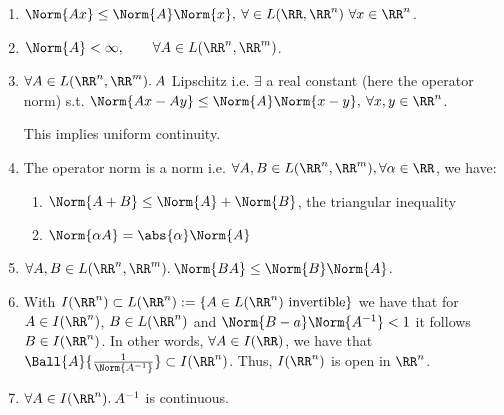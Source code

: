 \begin{thm}
 \begin{enumerate}
  \item $\Norm{Ax}\leq\Norm{A}\Norm{x}, \:\forall\in L(\RR, \RR^n)\ \forall x\in\RR^n$.
  \item $\Norm{A}<\infty,\qquad\forall A\in L(\RR^n,\RR^m)$.
  \item $\forall A\in L(\RR^n, \RR^m).\:A$ Lipschitz i.e. $\exists$ a real constant (here the operator norm) s.t. $\Norm{Ax-Ay}\leq\Norm{A}\Norm{x-y}, \:\forall x,y\in\RR^n$.
  \begin{exc}
   This implies uniform continuity.
  \end{exc}
  \item The operator norm is a norm i.e. $\forall A, B\in L(\RR^n,\RR^m), \forall \alpha\in\RR$, we have:
  \begin{enumerate}
   \item $\Norm{A+B}\leq \Norm{A}+\Norm{B}$, the triangular inequality
   \item $\Norm{\alpha A}=\abs{\alpha}\Norm{A}$
  \end{enumerate}
  \item $\forall A, B\in L(\RR^n, \RR^m).\:\Norm{BA}\leq \Norm{B}\Norm{A}$.
  \item With $I(\RR^n)\subset L(\RR^n):=\{A\in L(\RR^n)\text{ invertible}\}$ we have that for $A\in I(\RR^n)$, $B\in L(\RR^n)$ and $\Norm{B-a}\Norm{A^{-1}}<1$ it follows $B\in I(\RR^n)$. 
  In other words, $\forall A\in I(\RR)$, we have that $\Ball{A}{\frac{1}{\Norm{A^{-1}}}}\subset I(\RR^n)$. Thus, $I(\RR^n)$ is open in $\RR^n$.
  \item $\forall A\in I(\RR^n).\:A^{-1}$ is continuous. 
 \end{enumerate}
\end{thm}
